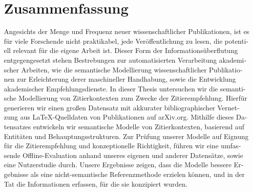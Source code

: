 \chapter*{Zusammenfassung}
\begin{otherlanguage}{ngerman}
Angesichts der Menge und Frequenz neuer wissenschaftlicher Publikationen, ist es für viele Forschende nicht praktikabel, jede Veröffentlichung zu lesen, die potentiell relevant für die eigene Arbeit ist. Dieser Form der Informationsüberflutung entgegengesetzt stehen Bestrebungen zur automatisierten Verarbeitung akademischer Arbeiten, wie die semantische Modellierung wissenschaftlicher Publikationen zur Erleichterung derer maschineller Handhabung, sowie die Entwicklung akademischer Empfehlungsdienste. In dieser Thesis untersuchen wir die semantische Modellierung von Zitierkontexten zum Zwecke der Zitierempfehlung. Hierfür generieren wir einen großen Datensatz mit akkurater bibliographischer Vernetzung aus \LaTeX{}-Quelldaten von Publikationen auf arXiv.org. Mithilfe dieses Datensatzes entwickeln wir semantische Modelle von Zitierkontexten, basierend auf Entitäten und Behauptungsstrukturen. Zur Prüfung unserer Modelle auf Eignung für die Zitierempfehlung und konzeptionelle Richtigkeit, führen wir eine umfassende Offline-Evaluation anhand unseres eigenen und anderer Datensätze, sowie eine Nutzerstudie durch. Unsere Ergebnisse zeigen, dass die Modelle bessere Ergebnisse als eine nicht-semantische Referenzmethode erzielen können, und in der Tat die Informationen erfassen, für die sie konzipiert wurden.
\end{otherlanguage}

